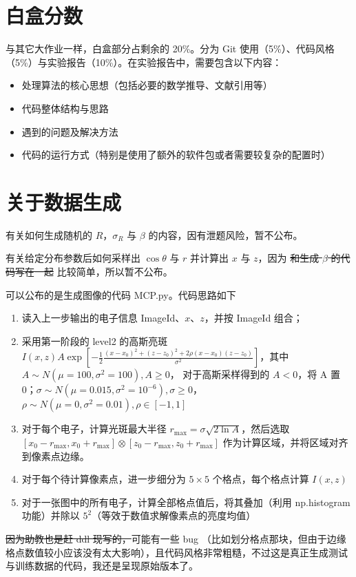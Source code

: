 \documentclass{article}
\begin{document}
\section{白盒分数} %
\label{sec:白盒分数}
与其它大作业一样，白盒部分占剩余的 20\%。分为 Git 使用（5\%）、代码风格（5\%）与实验报告（10\%）。在实验报告中，需要包含以下内容：
\begin{itemize}
    \item 处理算法的核心思想（包括必要的数学推导、文献引用等）
    \item 代码整体结构与思路
    \item 遇到的问题及解决方法
    \item 代码的运行方式（特别是使用了额外的软件包或者需要较复杂的配置时）
\end{itemize}
    

\section{关于数据生成} %
\label{sec:关于数据生成}

有关如何生成随机的 $R$，$\sigma_R$ 与 $\beta$ 的内容，因有泄题风险，暂不公布。

有关给定分布参数后如何采样出 $\cos\theta$ 与 $r$ 并计算出 $x$ 与 $z$，因为 \sout{和生成 $\beta$ 的代码写在一起} 比较简单，所以暂不公布。

可以公布的是生成图像的代码 MCP.py。代码思路如下

\begin{enumerate}
    \item 读入上一步输出的电子信息 ImageId、$x$、$z$，并按 ImageId 组合；
    \item 采用第一阶段的 level2 的高斯亮斑 $I(x,z) \displaystyle A\exp [-\frac{1}{2}\frac{(x-x_0)^2+(z-z_0)^2+2\rho (x-x_0)(z-z_0)}{\sigma^2}]$，其中 $A \sim N(\mu=100, \sigma^2=100), A\geqslant 0$， 对于高斯采样得到的 $A<0$，将 A 置0；$\sigma \sim N(\mu=0.015, \sigma^2=10^{-6}), \sigma \geqslant 0$，$\rho \sim N(\mu=0, \sigma^2=0.01), \rho \in [-1,1]$
    \item 对于每个电子，计算光斑最大半径 $r_\mathrm{max} = \sigma\sqrt{2\ln A}$，然后选取 $[x_0 - r_\mathrm{max}, x_0 + r_\mathrm{max}] \otimes [z_0 - r_\mathrm{max}, z_0 + r_\mathrm{max}]$ 作为计算区域，并将区域对齐到像素点边缘。
    \item 对于每个待计算像素点，进一步细分为 $5\times 5$ 个格点，每个格点计算 $I(x,z)$
    \item 对于一张图中的所有电子，计算全部格点值后，将其叠加（利用 np.histogram 功能）并除以 $5^2$（等效于数值求解像素点的亮度均值）
\end{enumerate}

\sout{因为助教也是赶 ddl 现写的，}可能有一些 bug （比如划分格点那块，但由于边缘格点数值较小应该没有太大影响），且代码风格非常粗糙，不过这是真正生成测试与训练数据的代码，我还是呈现原始版本了。

\end{document}
